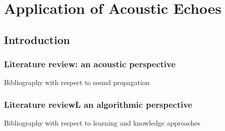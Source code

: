 \chapter{Application of Acoustic Echoes}\label{chap:application}

\section{Introduction}

\subsection{Literature review: an acoustic perspective}
Bibliography with respect to sound propagation

\subsection{Literature reviewL an algorithmic perspective}
Bibliography with respect to learning and knowledge approaches


\section{}